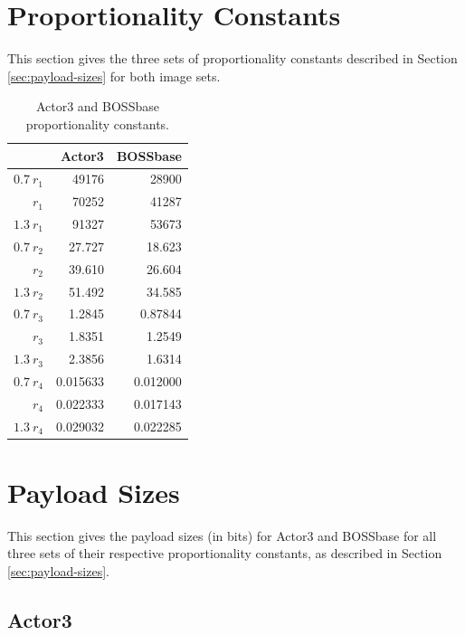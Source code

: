 \documentclass[11pt,a4paper,twoside,openright]{report}
\begin{document}
\begin{appendices}
\section{Proportionality Constants} \label{appendix:prop-constants}

This section gives the three sets of proportionality constants described in Section \ref{sec:payload-sizes} for both image sets.

\begin{table}[htbp]
    \begin{center}
        \begin{tabular}{ | r | r  r | }
        \hline
        & Actor3 & BOSSbase \\ \hline
        $0.7\ r_1$ & 49176 & 28900 \\
        $r_1$ & 70252 & 41287 \\
        $1.3\ r_1$ & 91327 & 53673 \\ \hline
        $0.7\ r_2$ & 27.727 & 18.623 \\
        $r_2$ & 39.610 & 26.604 \\
        $1.3\ r_2$ & 51.492 & 34.585 \\ \hline
        $0.7\ r_3$ & 1.2845 & 0.87844 \\
        $r_3$ & 1.8351 & 1.2549 \\
        $1.3\ r_3$ & 2.3856 & 1.6314 \\ \hline
        $0.7\ r_4$ & 0.015633 & 0.012000 \\
        $r_4$ & 0.022333 & 0.017143 \\
        $1.3\ r_4$ & 0.029032 & 0.022285 \\ \hline
        \end{tabular}
        \caption{Actor3 and BOSSbase proportionality constants.}
        \label{table:prop-constants}
    \end{center}
\end{table}


\section{Payload Sizes} \label{appendix:payload-sizes}

This section gives the payload sizes (in bits) for Actor3 and BOSSbase for all three sets of their respective proportionality constants, as described in Section \ref{sec:payload-sizes}.

\subsection{Actor3}


\end{appendices}
\end{document}
